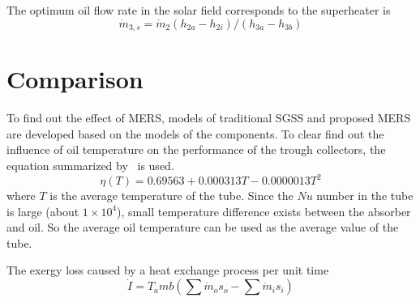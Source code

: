 The optimum oil flow rate in the solar field corresponds to the superheater is
\begin{equation}
  \dot{m}_{3,s} = \dot{m}_{2}(h_{2a} - h_{2i})/(h_{3a} - h_{3b})
\end{equation}

\section{Comparison}

To find out the effect of MERS, models of traditional SGSS and proposed MERS are developed based on the models of the components. To clear find out the influence of oil temperature on the performance of the trough collectors, the equation summarized by~\cite{Rovira2011} is used.
\begin{equation}
  \eta(T) =  0.69563 + 0.000313T - 0.0000013T^2
\end{equation}
where $T$ is the average temperature of the tube. Since the $Nu$ number in the tube is large (about $1\times 10^4$), small temperature difference exists between the absorber and oil. So the average oil temperature can be used as the average value of the tube.

The exergy loss caused by a heat exchange process per unit time
\begin{equation}
  \dot{I} = T_amb (\sum \dot{m}_os_o - \sum \dot{m}_is_i)
\end{equation}


